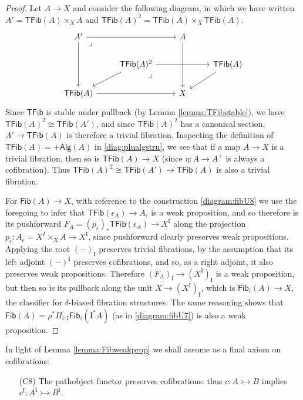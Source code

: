 \documentclass[11pt,reqno]{amsart}
\newcommand{\cof}{\ensuremath{\rightarrowtail}}
\renewcommand{\to}{\ensuremath{\rightarrow}}
\newcommand{\I}{\ensuremath{\mathrm{I}}}
\newcommand{\Fib}{\ensuremath{\mathsf{Fib}}}
\newcommand{\TFib}{\ensuremath{\mathsf{TFib}}}
\theoremstyle{remark}
\theoremstyle{definition}
\newcommand{\pbmark}{\ar[dr, phantom, "\lrcorner" very near start, shift right=.5ex]}	%
\begin{document}
%
\begin{proof}
Let $A\to X$ and consider the following diagram, in which we have written $A' = \TFib(A)\times_X A$ and $\TFib(A)^2 = \TFib(A)\times_X \TFib(A)$.
%
\begin{equation}\label{diagram:TFibweakprop}
\begin{tikzcd}
A' \ar[dd]  \ar[rr] \pbmark && A \ar[dd]  \\
& \TFib(A)^2 \ar[ld] \ar[rr]  \pbmark && \TFib(A) \ar[ld] \\
\TFib(A) \ar[rr] && X
\end{tikzcd}
\end{equation}
Since $\TFib$ is stable under pullback (by Lemma \ref{lemma:TFibstable}), we have $\TFib(A)^2 \cong \TFib(A')$, and since $\TFib(A)^2$ has a canonical section, $A' \to \TFib(A)$ is therefore a trivial fibration.  Inspecting the definition of $\TFib(A) = +\mathsf{Alg}(A)$ in \eqref{diag:plualgstru}, we see that if a map $A\to X$ is a trivial fibration, then so is $\TFib(A)\to X$ (since $\eta : A\to A^+$ is always a cofibration). Thus $\TFib(A)^2 \cong \TFib(A') \to\TFib(A)$ is also a trivial fibration.

For $\Fib(A)\to X$, with reference to the construction \eqref{diagram:fibU8} we use the foregoing to infer that $\TFib(\epsilon_A) \to A_\epsilon$ is a weak proposition, and so therefore is its pushforward $F_A = (p_\epsilon)_*\TFib(\epsilon_A)\to X^\I$ along the projection $p_\epsilon : A_\epsilon = X^I\times_X A \to X^\I$, since pushforward clearly preserves weak propositions.  Applying the root $(-)_\I$ preserves trivial fibrations, by the assumption that its left adjoint $(-)^\I$ preserves cofibrations, and so, as a right adjoint, it also preserves weak propositions. Therefore $(F_A)_\I \to (X^\I)_\I$ is a weak proposition, but then so is its pullback along the unit $X\to (X^\I)_\I$, which is $\Fib_i(A)\to X$, the classifier for $\delta$-biased fibration structures.  The same reasoning shows that $\Fib(A) = \rho^*\Pi_{i:\I}\Fib_i(\I^*A)$ (as in \eqref{diagram:fibU7}) is also a weak proposition.
\end{proof}

In light of Lemma \ref{lemma:Fibweakprop} we shall assume as a final axiom on cofibrations:
 
\begin{enumerate}
\item[(C8)] The pathobject functor preserves cofibrations: thus $c:A \cof B$ implies $c^\I:A^\I \cof B^\I$.
\end{enumerate}
\end{document}
